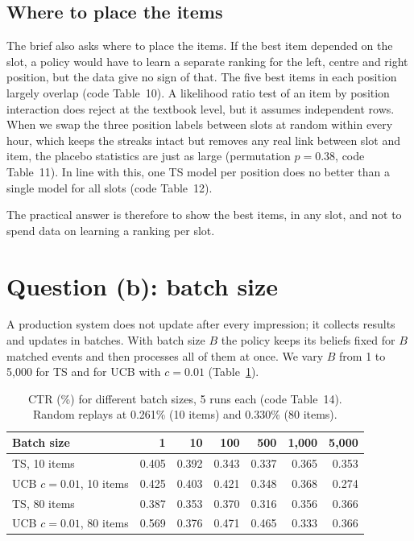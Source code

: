 \documentclass[11pt]{article}
\begin{document}
\subsection{Where to place the items}

The brief also asks where to place the items. If the best item depended on
the slot, a policy would have to learn a separate ranking for the left,
centre and right position, but the data give no sign of that. The five best
items in each position largely overlap (code Table~10). A likelihood ratio
test of an item by position interaction does reject at the textbook level,
but it assumes independent rows. When we swap the three position labels
between slots at random within every hour, which keeps the streaks intact
but removes any real link between slot and item, the placebo statistics are
just as large (permutation $p=0.38$, code Table~11). In line with this, one
TS model per position does no better than a single model for all slots
(code Table~12).

The practical answer is therefore to show the best items, in any slot, and
not to spend data on learning a ranking per slot.

\section{Question (b): batch size}
\label{sec:b}

A production system does not update after every impression; it collects
results and updates in batches. With batch size $B$ the policy keeps its
beliefs fixed for $B$ matched events and then processes all of them at once.
We vary $B$ from 1 to 5{,}000 for TS and for UCB with $c=0.01$
(Table~\ref{tab:b}).

\begin{table}[H]
  \centering
  \caption{CTR (\%) for different batch sizes, 5 runs each (code Table~14).
    Random replays at 0.261\% (10 items) and 0.330\% (80 items).}
  \label{tab:b}
  \small
  \begin{tabular}{lrrrrrr}
    \toprule
    Batch size & 1 & 10 & 100 & 500 & 1{,}000 & 5{,}000 \\
    \midrule
    TS, 10 items            & 0.405 & 0.392 & 0.343 & 0.337 & 0.365 & 0.353 \\
    UCB $c=0.01$, 10 items  & 0.425 & 0.403 & 0.421 & 0.348 & 0.368 & 0.274 \\
    TS, 80 items            & 0.387 & 0.353 & 0.370 & 0.316 & 0.356 & 0.366 \\
    UCB $c=0.01$, 80 items  & 0.569 & 0.376 & 0.471 & 0.465 & 0.333 & 0.366 \\
    \bottomrule
  \end{tabular}
\end{table}
\end{document}
